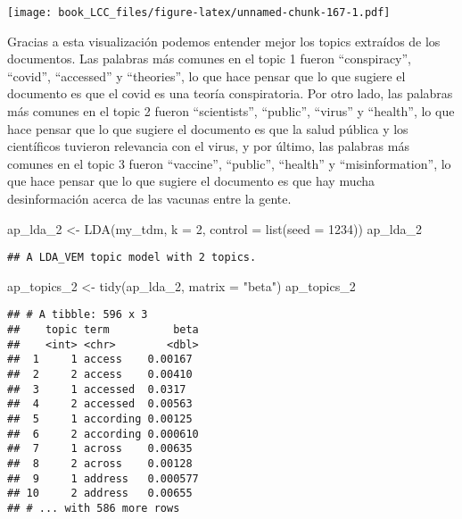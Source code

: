 \documentclass[
]{book}
\newenvironment{Shaded}{\begin{snugshade}}{\end{snugshade}}
\newcommand{\AttributeTok}[1]{\textcolor[rgb]{0.77,0.63,0.00}{#1}}
\newcommand{\DecValTok}[1]{\textcolor[rgb]{0.00,0.00,0.81}{#1}}
\newcommand{\FunctionTok}[1]{\textcolor[rgb]{0.00,0.00,0.00}{#1}}
\newcommand{\NormalTok}[1]{#1}
\newcommand{\OtherTok}[1]{\textcolor[rgb]{0.56,0.35,0.01}{#1}}
\newcommand{\StringTok}[1]{\textcolor[rgb]{0.31,0.60,0.02}{#1}}
\begin{document}
\texttt{[image: book\_LCC\_files/figure-latex/unnamed-chunk-167-1.pdf]}

Gracias a esta visualización podemos entender mejor los topics extraídos de los documentos. Las palabras más comunes en el topic 1 fueron ``conspiracy'', ``covid'', ``accessed'' y ``theories'', lo que hace pensar que lo que sugiere el documento es que el covid es una teoría conspiratoria. Por otro lado, las palabras más comunes en el topic 2 fueron ``scientists'', ``public'', ``virus'' y ``health'', lo que hace pensar que lo que sugiere el documento es que la salud pública y los científicos tuvieron relevancia con el virus, y por último, las palabras más comunes en el topic 3 fueron ``vaccine'', ``public'', ``health'' y ``misinformation'', lo que hace pensar que lo que sugiere el documento es que hay mucha desinformación acerca de las vacunas entre la gente.

\begin{Shaded}
\begin{Highlighting}[]
\NormalTok{ap\_lda\_2 }\OtherTok{\textless{}{-}} \FunctionTok{LDA}\NormalTok{(my\_tdm, }\AttributeTok{k =} \DecValTok{2}\NormalTok{, }\AttributeTok{control =} \FunctionTok{list}\NormalTok{(}\AttributeTok{seed =} \DecValTok{1234}\NormalTok{))}
\NormalTok{ap\_lda\_2}
\end{Highlighting}
\end{Shaded}

\begin{verbatim}
## A LDA_VEM topic model with 2 topics.
\end{verbatim}

\begin{Shaded}
\begin{Highlighting}[]
\NormalTok{ap\_topics\_2 }\OtherTok{\textless{}{-}} \FunctionTok{tidy}\NormalTok{(ap\_lda\_2, }\AttributeTok{matrix =} \StringTok{"beta"}\NormalTok{)}
\NormalTok{ap\_topics\_2}
\end{Highlighting}
\end{Shaded}

\begin{verbatim}
## # A tibble: 596 x 3
##    topic term          beta
##    <int> <chr>        <dbl>
##  1     1 access    0.00167 
##  2     2 access    0.00410 
##  3     1 accessed  0.0317  
##  4     2 accessed  0.00563 
##  5     1 according 0.00125 
##  6     2 according 0.000610
##  7     1 across    0.00635 
##  8     2 across    0.00128 
##  9     1 address   0.000577
## 10     2 address   0.00655 
## # ... with 586 more rows
\end{verbatim}
\end{document}
